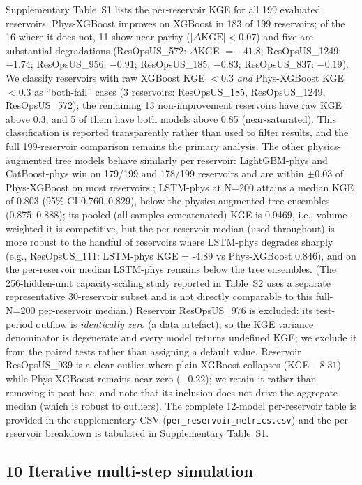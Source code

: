 \documentclass[journal]{ascelike-new}
\begin{document}
Supplementary Table~S1 lists the per-reservoir KGE for all 199 evaluated reservoirs. Phys-XGBoost improves on XGBoost in 183 of 199 reservoirs; of the 16 where it does not, 11 show near-parity ($|\Delta\mathrm{KGE}| < 0.07$) and five are substantial degradations (ResOpsUS\_572: $\Delta$KGE $= -41.8$; ResOpsUS\_1249: $-1.74$; ResOpsUS\_956: $-0.91$; ResOpsUS\_185: $-0.83$; ResOpsUS\_837: $-0.19$). We classify reservoirs with raw XGBoost KGE $< 0.3$ \emph{and} Phys-XGBoost KGE $< 0.3$ as ``both-fail'' cases (3 reservoirs: ResOpsUS\_185, ResOpsUS\_1249, ResOpsUS\_572); the remaining 13 non-improvement reservoirs have raw KGE above 0.3, and 5 of them have both models above 0.85 (near-saturated). This classification is reported transparently rather than used to filter results, and the full 199-reservoir comparison remains the primary analysis. The other physics-augmented tree models behave similarly per reservoir: LightGBM-phys and CatBoost-phys win on 179/199 and 178/199 reservoirs and are within $\pm$0.03 of Phys-XGBoost on most reservoirs.; LSTM-phys at N=200 attains a median KGE of 0.803 (95\% CI 0.760--0.829), below the physics-augmented tree ensembles (0.875--0.888); its pooled (all-samples-concatenated) KGE is 0.9469, i.e., volume-weighted it is competitive, but the per-reservoir median (used throughout) is more robust to the handful of reservoirs where LSTM-phys degrades sharply (e.g., ResOpsUS\_111: LSTM-phys KGE = -4.89 vs Phys-XGBoost 0.846), and on the per-reservoir median LSTM-phys remains below the tree ensembles. (The 256-hidden-unit capacity-scaling study reported in Table~S2 uses a separate representative 30-reservoir subset and is not directly comparable to this full-N=200 per-reservoir median.) Reservoir ResOpsUS\_976 is excluded: its test-period outflow is \emph{identically zero} (a data artefact), so the KGE variance denominator is degenerate and every model returns undefined KGE; we exclude it from the paired tests rather than assigning a default value. Reservoir ResOpsUS\_939 is a clear outlier where plain XGBoost collapses (KGE $-8.31$) while Phys-XGBoost remains near-zero ($-0.22$); we retain it rather than removing it post hoc, and note that its inclusion does not drive the aggregate median (which is robust to outliers). The complete 12-model per-reservoir table is provided in the supplementary CSV (\texttt{per\_reservoir\_metrics.csv}) and the per-reservoir breakdown is tabulated in Supplementary Table~S1.






\subsection{10 Iterative multi-step simulation}
\end{document}
